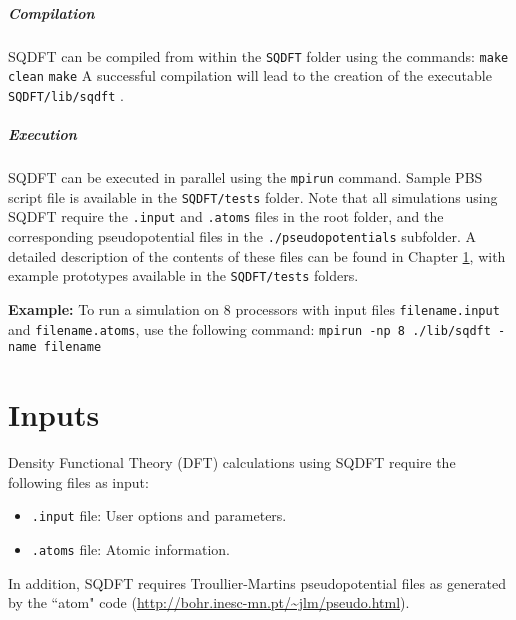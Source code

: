 \documentclass[12pt]{report}
\begin{document}
\paragraph{Compilation} SQDFT can be compiled from within the \texttt{SQDFT} folder using the commands:
\vspace{2mm} \newline 
\texttt{make clean}\newline
\texttt{make} \vspace{2mm} \newline
A successful compilation will lead to the creation of the executable \texttt{SQDFT/lib/sqdft} . \vspace{-4mm}

\paragraph{Execution} SQDFT can be executed in parallel using the \texttt{mpirun} command. Sample PBS script file is available in the \texttt{SQDFT/tests} folder. Note that all simulations using SQDFT require the \texttt{.input} and \texttt{.atoms} files in the root folder, and the corresponding pseudopotential files in the \texttt{./pseudopotentials} subfolder. A detailed description of the contents of these files can be found in Chapter \ref{Chap:Input}, with example prototypes available in the \texttt{SQDFT/tests} folders. 

\textbf{Example:} To run a simulation on $8$ processors with input files \texttt{filename.input} and \texttt{filename.atoms}, use the following command: \vspace{2mm} \newline  
\texttt{mpirun -np 8 ./lib/sqdft -name filename} \vspace{2mm} \newline

\chapter{Inputs} \label{Chap:Input}
Density Functional Theory (DFT) calculations using SQDFT require the following files as input:
\begin{itemize}
\item \texttt{.input} file: User options and parameters.
\item \texttt{.atoms} file:  Atomic information.
 
\end{itemize}
In addition, SQDFT requires Troullier-Martins pseudopotential files as generated by the ``atom" code (\url{http://bohr.inesc-mn.pt/~jlm/pseudo.html}). 
\end{document}
